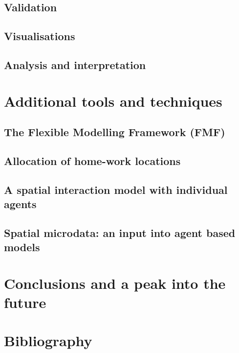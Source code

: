 \documentclass[a5paper, 11pt, twoside]{book}  %
\begin{document}
\section{Validation}

\section{Visualisations}

\section{Analysis and interpretation}


\chapter{Additional tools and techniques}


\section{The Flexible Modelling Framework (FMF)}

\section{Allocation of home-work locations}

\section{A spatial interaction model with individual agents}

\section{Spatial microdata: an input into agent based models}


\chapter{Conclusions and a peak into the future}

\chapter{Bibliography}
\label{Bibliography}

  


\printindex
\label{index}
{}
\end{document}
